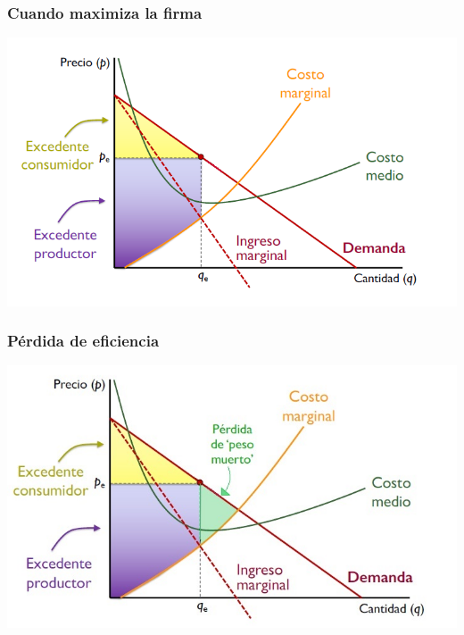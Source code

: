 \documentclass{beamer}
\begin{document}
\begin{frame}
\frametitle{Cuando maximiza la firma}
\includegraphics[scale=0.6]{Slides Principios de Economia/Figures/Tema_06.41_excedente4.png}
\end{frame}

\begin{frame}
\frametitle{Pérdida de eficiencia}
\includegraphics[scale=0.6]{Slides Principios de Economia/Figures/Tema_06.42_excedente5.jpg}
\end{frame}
\end{document}
